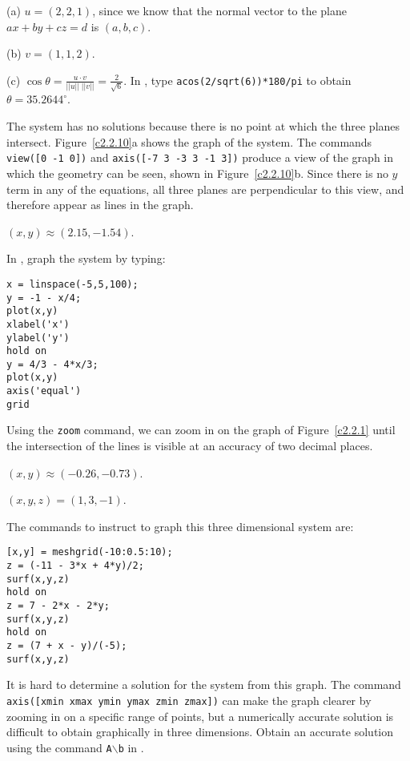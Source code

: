 (a) $u = (2,2,1)$, since we know that the normal vector to the plane
$ax + by + cz = d$ is $(a,b,c)$.

(b) $v = (1,1,2)$.

(c) $\cos\theta = \frac{u \cdot v}{||u||\;||v||} = \frac{2}{\sqrt{6}}$.
In \Matlabp, type {\tt acos(2/sqrt(6))*180/pi} to obtain $\theta =
35.2644^\circ$.

The system has no solutions because there is no point at which the three
planes intersect.  Figure~\ref{c2.2.10}a shows the \Matlab graph of
the system.  The commands {\tt view([0 -1 0])} and 
{\tt axis([-7 3 -3 3 -1 3])}
produce a view of the graph in which the geometry
can be seen, shown in Figure~\ref{c2.2.10}b.
Since there is no $y$ term in any of the equations, all three planes
are perpendicular to this view, and therefore appear as lines in the
graph.

\begin{figure}[htb]
                       \centerline{%
                       }
\end{figure}





\ans $(x,y) \approx (2.15,-1.54)$.

\soln In \Matlab, graph the system by typing:
\begin{verbatim}
x = linspace(-5,5,100);
y = -1 - x/4;
plot(x,y)
xlabel('x')
ylabel('y')
hold on
y = 4/3 - 4*x/3;
plot(x,y)
axis('equal')
grid
\end{verbatim}

Using the {\tt zoom} command, we can zoom in on the graph of
Figure~\ref{c2.2.1} until the intersection of the lines is
visible at an accuracy of two decimal places.  

\begin{figure}[htb]
                       \centerline{%
                       }
\end{figure}

$(x,y) \approx (-0.26,-0.73)$.

\newpage
{}
\ans $(x,y,z) = (1,3,-1)$.

\soln The commands to instruct \Matlab to graph this three dimensional
system are:
\begin{verbatim}
[x,y] = meshgrid(-10:0.5:10);
z = (-11 - 3*x + 4*y)/2;
surf(x,y,z)
hold on 
z = 7 - 2*x - 2*y;
surf(x,y,z)
hold on
z = (7 + x - y)/(-5);
surf(x,y,z)
\end{verbatim}
It is hard to determine a solution for the system from this graph.
The command {\tt axis([xmin xmax ymin ymax zmin zmax])} can make the
graph clearer by zooming in on a specific range of points, but a
numerically accurate solution is difficult to obtain graphically in
three dimensions.  Obtain an accurate solution using the command
{\tt A}$\backslash${\tt b} in \Matlabp.

